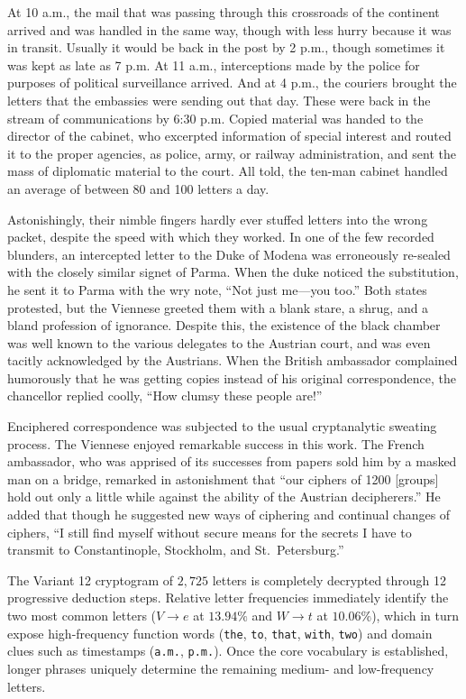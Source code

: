 \documentclass{utmreport}
\begin{document}
At 10 a.m., the mail that was passing through this crossroads of the continent arrived and was handled in the same way, though with less hurry because it was in transit. Usually it would be back in the post by 2 p.m., though sometimes it was kept as late as 7 p.m. At 11 a.m., interceptions made by the police for purposes of political surveillance arrived. And at 4 p.m., the couriers brought the letters that the embassies were sending out that day. These were back in the stream of communications by 6:30 p.m. Copied material was handed to the director of the cabinet, who excerpted information of special interest and routed it to the proper agencies, as police, army, or railway administration, and sent the mass of diplomatic material to the court. All told, the ten-man cabinet handled an average of between 80 and 100 letters a day.

Astonishingly, their nimble fingers hardly ever stuffed letters into the wrong packet, despite the speed with which they worked. In one of the few recorded blunders, an intercepted letter to the Duke of Modena was erroneously re-sealed with the closely similar signet of Parma. When the duke noticed the substitution, he sent it to Parma with the wry note, ``Not just me---you too.'' Both states protested, but the Viennese greeted them with a blank stare, a shrug, and a bland profession of ignorance. Despite this, the existence of the black chamber was well known to the various delegates to the Austrian court, and was even tacitly acknowledged by the Austrians. When the British ambassador complained humorously that he was getting copies instead of his original correspondence, the chancellor replied coolly, ``How clumsy these people are!''

Enciphered correspondence was subjected to the usual cryptanalytic sweating process. The Viennese enjoyed remarkable success in this work. The French ambassador, who was apprised of its successes from papers sold him by a masked man on a bridge, remarked in astonishment that ``our ciphers of 1200 [groups] hold out only a little while against the ability of the Austrian decipherers.'' He added that though he suggested new ways of ciphering and continual changes of ciphers, ``I still find myself without secure means for the secrets I have to transmit to Constantinople, Stockholm, and St.\ Petersburg.''

\utmconclusions
The Variant 12 cryptogram of $2{,}725$ letters is completely decrypted through 12 progressive deduction steps. Relative letter frequencies immediately identify the two most common letters ($V\rightarrow e$ at $13.94\%$ and $W\rightarrow t$ at $10.06\%$), which in turn expose high-frequency function words (\texttt{the}, \texttt{to}, \texttt{that}, \texttt{with}, \texttt{two}) and domain clues such as timestamps (\texttt{a.m.}, \texttt{p.m.}). Once the core vocabulary is established, longer phrases uniquely determine the remaining medium- and low-frequency letters.
\end{document}
